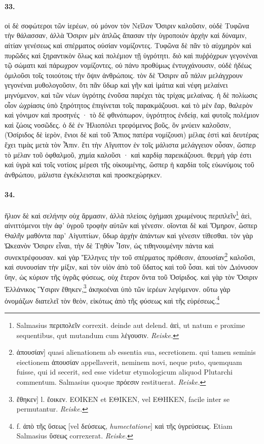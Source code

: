\documentclass[a4paper, 11pt, oneside, polutonikogreek, german]{article}
\begin{document}
\paragraph{33.}
οἱ δὲ σοφώτεροι τῶν ἱερέων, οὐ μόνον τὸν Νεῖλον Ὄσιριν καλοῦσιν, οὐδὲ Τυφῶνα τὴν θάλασσαν, ἀλλὰ Ὄσιριν μὲν ἁπλῶς ἅπασαν τὴν ὑγροποιὸν ἀρχὴν καὶ δύναμιν, αἰτίαν γενέσεως καὶ σπέρματος οὐσίαν νομίζοντες. Τυφῶνα δὲ πᾶν τὸ αὐχμηρὸν καὶ πυρῶδες καὶ ξηραντικὸν ὅλως καὶ πολέμιον τῇ ὑγρότητι. διὸ καὶ πυῤῥόχρων γεγονέναι τῷ σώματι καὶ πάρωχρον νομίζοντες, οὐ πάνυ προθύμως ἐντυγχάνουσιν, οὐδὲ ἡδέως ὁμιλοῦσι τοῖς τοιούτοις τὴν ὄψιν ἀνθρώποις. τὸν δὲ Ὄσιριν αὖ πάλιν μελάγχρουν γεγονέναι μυθολογοῦσιν, ὅτι πᾶν ὕδωρ καὶ γῆν καὶ ἱμάτια καὶ νέφη μελαίνει μιγνύμενον, καὶ τῶν νέων ὑγρότης ἐνοῦσα παρέχει τὰς τρίχας μελαίνας. ἡ δὲ πολίωσις οἷον ὠχρίασις ὑπὸ ξηρότητος ἐπιγίνεται τοῖς παρακμάζουσι. καὶ τὸ μὲν ἔαρ, θαλερὸν καὶ γόνιμον καὶ προσηνές · τὸ δὲ φθινόπωρον, ὑγρότητος ἐνδείᾳ, καὶ φυτοῖς πολέμιον καὶ ζώοις νοσῶδες. ὁ δὲ ἐν Ἡλιοπόλει τρεφόμενος βοῦς, ὃν μνύειν καλοῦσιν, (Ὀσίριδος δὲ ἱερὸν, ἔνιοι δὲ καὶ τοῦ Ἄπιος πατέρα νομίζουσι) μέλας ἐστὶ καὶ δευτέρας ἔχει τιμὰς μετὰ τὸν Ἆπιν. ἔτι τὴν Αἴγυπτον ἐν τοῖς μάλιστα μελάγγειον οὖσαν, ὥσπερ τὸ μέλαν τοῦ ὀφθαλμοῦ, χημία καλοῦσι · καὶ καρδίᾳ παρεικάζουσι. θερμὴ γάρ ἐστι καὶ ὑγρὰ καὶ τοῖς νοτίοις μέρεσι τῆς οἰκουμένης, ὥσπερ ἡ καρδία τοῖς εὐωνύμοις τοῦ ἀνθρώπου, μάλιστα ἐγκέκλεισται καὶ προσκεχώρηκεν.

\paragraph{34.}
ἥλιον δὲ καὶ σελήνην οὐχ ἅρμασιν, ἀλλὰ πλείοις ὀχήμασι χρωμένους περιπλεῖν\footnote{Salmasius περιπολεῖν correxit. deinde aut delend. ἁεὶ, ut natum e proxime sequentibus, qut mutandum cum λέγουσιν. \emph{Reiske.}} ἀεὶ, αἰνιττόμενοι τὴν ἀφ' ὑγροῦ τροφὴν αὐτῶν καὶ γένεσιν. οἴονται δὲ καὶ Ὅμηρον, ὥσπερ Θαλῆν μαθόντα παρ' Αἰγυπτίων, ὕδωρ ἀρχὴν ἁπάντων καὶ γένεσιν τίθεσθαι. τὸν γὰρ Ὠκεανὸν Ὄσιριν εἶναι, τὴν δὲ Τηθὺν Ἶσιν, ὡς τιθηνουμένην πάντα καὶ συνεκτρέφουσαν. καὶ γὰρ Ἕλληνες τὴν τοῦ σπέρματος πρόθεσιν, ἀπουσίαν\footnote{ἀπουσίαν] quasi alienationem ab essentia sua, secretionem. qui tamen seminis eiectionem ἀπουσίαν appellaverit, neminem novi, neque puto, quemquam fuisse, qui id secerit, sed esse videtur etymologicum aliquod Plutarchi commentum. Salmasius quoque πρόεσιν restituerat. \emph{Reiske.}} καλοῦσι, καὶ συνουσίαν τὴν μίξιν, καὶ τὸν υἱὸν ἀπὸ τοῦ ὕδατος καὶ τοῦ ὗσαι. καὶ τὸν Διόνυσον ὕην, ὡς κύριον τῆς ὑγρᾶς φύσεως, οὐχ ἕτερον ὄντα τοῦ Ὀσίριδος. καὶ γὰρ τὸν Ὄσιριν Ἑλλάνικος Ὕσιριν ἔθηκεν,\footnote{ἔθηκεν] l. ἔοικεν. ΕΟΙΚΕΝ et ΕΘΙΚΕΝ, vel ΕΘΗΚΕΝ, facile inter se permutantur. \emph{Reiske.}} ἀκηκοέναι ὑπὸ τῶν ἱερέων λεγόμενον. οὕτω γὰρ ὀνομάζων διατελεῖ τὸν θεὸν, εἰκότως ἀπὸ τῆς φύσεως καὶ τῆς εὑρέσεως.\footnote{f. ἀπὸ τῆς ὕσεως [vel δεύσεως, \emph{humectatione}] καὶ τῆς ὑγρεύσεως. Etiam Salmasius ὕσεως correxerat. \emph{Reiske.}}
\end{document}
